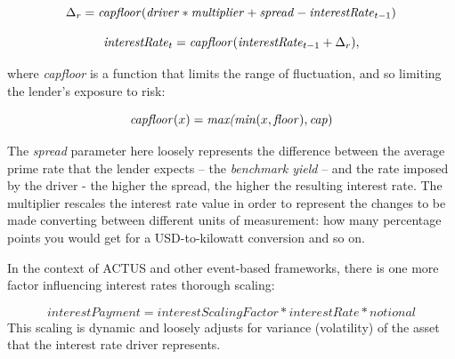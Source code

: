 \documentclass[runningheads]{llncs}
\newcommand{\ident}[1]{\mbox{\emph{#1}}}
\begin{document}


\noindent 
\begin{equation}
\Delta_{r}=\ident{capfloor}(\ident{driver}*\ident{multiplier}+\ident{spread}-\ident{interestRate}_{t-1})
\end{equation}

\noindent 
\begin{equation}
\ident{interestRate}_{t}=\ident{capfloor}(\ident{interestRate}_{t-1}+\Delta_{r}),
\end{equation}

\noindent
where \emph{capfloor} is a function that limits the range of fluctuation,  
and so limiting the lender's exposure to risk:

\noindent 
\begin{equation}
\ident{capfloor}(x)=\ident{max(min}(x,\ident{floor}),\ident{cap})
\end{equation}

\noindent
The \emph{spread} parameter here loosely represents the difference between
the average prime 
rate that the lender expects -- the \emph{benchmark yield} -- and
the rate imposed by the driver - the higher the spread, the higher
the resulting interest rate. The multiplier %
rescales the interest rate value 
in order to represent the changes to be made converting between different units
of measurement: how many percentage points 
you would get for a USD-to-kilowatt conversion
and so on.

In the context of ACTUS and other event-based frameworks, 
there is
one more factor influencing interest rates thorough scaling:

\noindent 
\begin{equation}
interestPayment=interestScalingFactor*interestRate*notional
\end{equation}
\noindent
This scaling is dynamic and loosely adjusts for variance (volatility)
of the asset that the interest rate driver represents.
\end{document}

